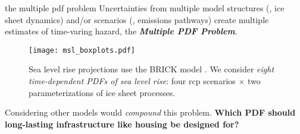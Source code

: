 \begin{block}{the multiple pdf problem}
    Uncertainties from multiple model structures (\eg, ice sheet dynamics) and/or scenarios (\eg, emissions pathways) create multiple estimates of time-varing hazard, \ie the \textbf{\itshape{Multiple PDF Problem}}.
    \begin{framed}
        \begin{figure}
            \centering
            \texttt{[image: msl\_boxplots.pdf]}
            \caption{
                Sea level rise projections use the BRICK model \cite{wong_brick0.2:2017}.
                We consider \emph{eight time-dependent PDFs of sea level rise}: four \gls{rcp} scenarios $\times$ two parameterizations of ice sheet processes.
            }\label{fig:boxplots}
        \end{figure}
    \end{framed}
    Considering other models \cite{kopp_evolving:2017,deconto_antarctica:2016,ruckert_coastal:2019} would \emph{compound} this problem.
    \textbf{Which PDF should long-lasting infrastructure like housing be designed for?}
\end{block}